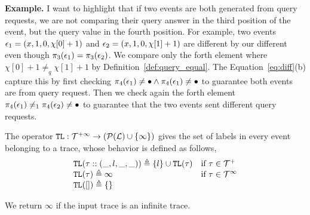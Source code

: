 \textbf{Example.}
I want to highlight that if two events are both generated from query requests, we are not comparing their query answer in the third position of the event, but the query value in the fourth position.
For example, two events $\mathtt{\epsilon}_1 = (x, 1, 0, \chi[0]+1)$ and $\mathtt{\epsilon}_2 = (x, 1, 0, \chi[1] + 1)$ are different by our different even though $\pi_3(\mathtt{\epsilon}_1) = \pi_3(\mathtt{\epsilon}_2)$.
We compare only the forth element where $ \chi[0]+1 \neq_q \chi[1] + 1$ by Definition~\ref{def:query_equal}.
The Equation~\ref{eq:diff}(b) capture this by first checking
$\pi_4(\mathtt{\epsilon}_1) \neq \bullet \land \pi_4(\mathtt{\epsilon}_1) \neq \bullet$ to guarantee
both events are from query request.
Then we check again the forth element $\pi_4(\mathtt{\epsilon}_1) \neq_1 \pi_4(\mathtt{\epsilon}_2) \neq \bullet$ to guarantee
that the two events sent different query requests.

The operator $\mathtt{TL} : \mathcal{T}^{+\infty} \to (\mathcal{P}{(\mathcal{L})} \cup \{ \infty \})$ gives the set of labels in every event belonging to 
a trace, whose behavior is defined as follows,
\[
\begin{array}{ll}
    \mathtt{TL}{(\mathtt{\tau} :: (\_, l, \_, \_)) } \triangleq \{l\} \cup \mathtt{TL}{(\mathtt{\tau} )} & \text{if}~ \mathtt{\tau} \in \mathcal{T}^{+}
    \\
    \mathtt{TL}{(\mathtt{\tau})} \triangleq \infty & \text{if}~ \mathtt{\tau} \in \mathcal{T}^{\infty}
    \\
    \mathtt{TL}({[ ]}) \triangleq \{\}
\end{array}
\]

We return $\infty$ if the input trace is an infinite trace.

